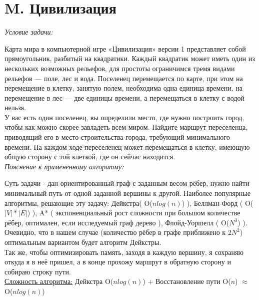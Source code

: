 \tableofcontents

\newpage

\section{M. Цивилизация}
\textit{Условие задачи:} \par
Карта мира в компьютерной игре «Цивилизация» версии 1 представляет собой прямоугольник, разбитый на квадратики. Каждый квадратик может иметь один из
нескольких возможных рельефов, для простоты ограничимся тремя видами рельефов — поле, лес и вода. Поселенец перемещается по карте, при этом на перемещение
в клетку, занятую полем, необходима одна единица времени, на перемещение в лес — две единицы времени, а перемещаться в клетку с водой нельзя.\\
У вас есть один поселенец, вы определили место, где нужно построить город, чтобы как можно скорее завладеть всем миром. Найдите маршрут переселенца,
приводящий его в место строительства города, требующий минимального времени. На каждом ходе переселенец может перемещаться в клетку, имеющую общую сторону
с той клеткой, где он сейчас находится.\\

\textit{Пояснение к примененному алгоритму:} \par
Суть задачи - дан ориентированный граф с заданным весом рёбер, нужно найти минимальный путь от одной заданной вершины к другой. Наиболее популярные
алгоритмы, решающие эту задачу: Дейкстра( O($nlog(n)$) ), Беллман-Форд ( O($|V| * |E|$) ), A* ( экспоненциальный рост сложности при большом количестве
рёбер, оптимален, если исследуемый граф дерево ), Флойд-Уоршелл ( O($N^3$) ). Очевидно, что в нашем случае (количество рёбер в графе приближено к 2$N^2$)
оптимальным вариантом будет алгоритм Дейкстры.\\
Так же, чтобы оптимизировать память, заходя в каждую вершину, я сохраняю откуда я в неё пришел, а в конце прохожу маршрут в обратную сторону и собираю строку
пути.\\
\underline{Сложность алгоритма:} Дейкстра O($nlog(n)$) + Восстановление пути O($n$) $\approx$ O($nlog(n)$)\\


